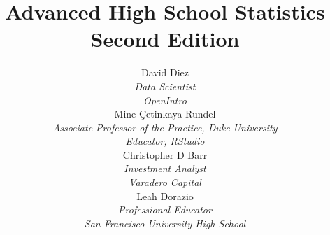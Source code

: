 
\title{\huge Advanced High School Statistics\vspace{1.5mm} \\ \Large Second Edition}
\author{David Diez \\
\small\emph{Data Scientist}\\
\small\emph{OpenIntro} \\[6mm]
Mine \c{C}etinkaya-Rundel \\
\small\emph{Associate Professor of the Practice,
    Duke University} \\
\small\emph{Educator, RStudio} \\[6mm]
Christopher D Barr \\
\small\emph{Investment Analyst} \\
\small\emph{Varadero Capital} \\[6mm]
Leah Dorazio \\
\small\emph{Professional Educator}\\
\small\emph{San Francisco University High School} \\
}
